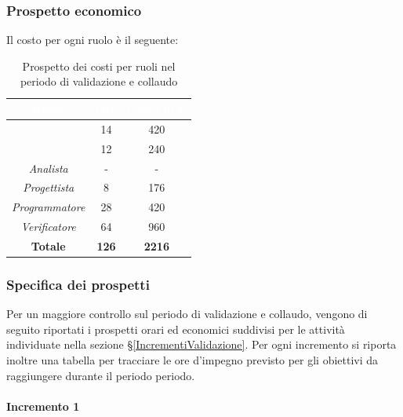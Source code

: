 \subsubsection{Prospetto economico}
Il costo per ogni ruolo è il seguente:
\begin{table}[H]
	\begin{center}
		\begin{tabular}{ |c c c| }
			\rowcolor{darkblue} 
			\textcolor{white}{\textbf{Ruolo}} & \textcolor{white}{\textbf{Ore}} & \textcolor{white}{\textbf{Costo in €}}\\ \hline
			{\Responsabile} 			& 14 	& 420 \\ \hline
			{\Amministratore}		 	& 12 	& 240 \\ \hline
			\textit{Analista} 			& - 	& - \\ \hline
			\textit{Progettista} 		& 8 	& 176 \\ \hline
			\textit{Programmatore}  	& 28 	& 420 \\ \hline
			\textit{Verificatore} 		& 64 	& 960 \\ \hline
			\textbf{Totale} & \textbf{126} & \textbf{2216} \\ \hline
		\end{tabular}
		\caption{Prospetto dei costi per ruoli nel periodo di validazione e collaudo}
	\end{center}
\end{table}
\subsubsection{Specifica dei prospetti}\label{SpecificaValidazione}
Per un maggiore controllo sul periodo di validazione e collaudo, vengono di seguito riportati i prospetti orari ed economici suddivisi per le attività individuate nella sezione \S\ref{IncrementiValidazione}. Per ogni incremento si riporta inoltre una tabella per tracciare le ore d'impegno previsto per gli obiettivi da raggiungere durante il periodo periodo.
\paragraph{Incremento 1}
